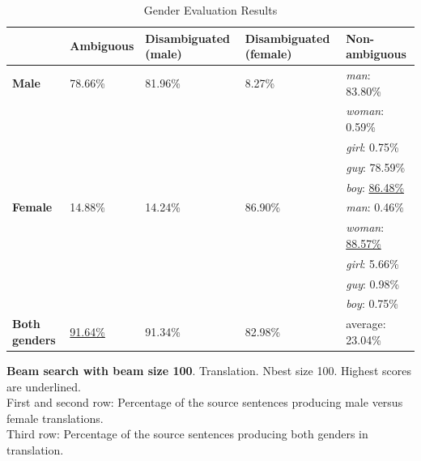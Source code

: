 \begin{table}[!htb]
    \begin{subtable}{\textwidth}
        \centering
        \begin{tabularx}{\linewidth}{|X|XXXX|}
            \hline
             & \textbf{Ambiguous} & \textbf{Disambiguated (male)} & \textbf{Disambiguated (female)} & \textbf{Non-ambiguous} \\ \hline
             \textbf{Male} & 78.66\% & 81.96\% & 8.27\% & \textit{man}: 83.80\% \\
             &&&& \textit{woman}: 0.59\% \\
             &&&& \textit{girl}: 0.75\% \\
             &&&& \textit{guy}: 78.59\% \\
             &&&& \textit{boy}: \underline{86.48\%} \\ \hline
             \textbf{Female} & 14.88\% & 14.24\% & 86.90\% & \textit{man}: 0.46\% \\ 
             &&&& \textit{woman}: \underline{88.57\%} \\
             &&&& \textit{girl}: 5.66\% \\
             &&&& \textit{guy}: 0.98\% \\
             &&&& \textit{boy}: 0.75\% \\\hline
             \textbf{Both genders} & \underline{91.64\%} & 91.34\% & 82.98\% & average: 23.04\% \\ \hline
        \end{tabularx}
        \caption{\textbf{Beam search with beam size 100}. Translation. Nbest size 100. Highest scores are underlined. \\ First and second row: Percentage of the source sentences producing male versus female translations. \\ Third row: Percentage of the source sentences producing both genders in translation.}
        \label{tab:gender_percent_100}
    \end{subtable}
    
    \caption{Gender Evaluation Results}
    \label{tab:gender_percent}
\end{table}
\clearpage %

